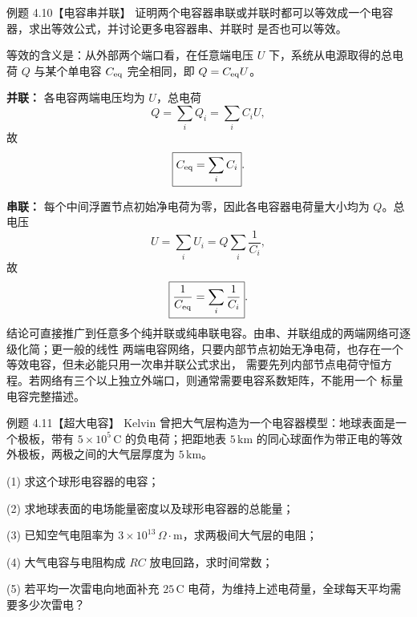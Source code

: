 \begin{origexamplebox}{例题 4.10【电容串并联】}
证明两个电容器串联或并联时都可以等效成一个电容器，求出等效公式，并讨论更多电容器串、并联时
是否也可以等效。
\end{origexamplebox}

\begin{xesolution}
等效的含义是：从外部两个端口看，在任意端电压 $U$ 下，系统从电源取得的总电荷 $Q$ 与某个单电容
$C_{\rm eq}$ 完全相同，即 $Q=C_{\rm eq}U$。

\textbf{并联：} 各电容两端电压均为 $U$，总电荷
\[
 Q=\sum_iQ_i=\sum_iC_iU,
\]
故
\[
 \boxed{C_{\rm eq}=\sum_iC_i}.
\]

\textbf{串联：} 每个中间浮置节点初始净电荷为零，因此各电容器电荷量大小均为 $Q$。总电压
\[
 U=\sum_iU_i=Q\sum_i\frac1{C_i},
\]
故
\[
 \boxed{\frac1{C_{\rm eq}}=\sum_i\frac1{C_i}}.
\]
结论可直接推广到任意多个纯并联或纯串联电容。由串、并联组成的两端网络可逐级化简；更一般的线性
两端电容网络，只要内部节点初始无净电荷，也存在一个等效电容，但未必能只用一次串并联公式求出，
需要先列内部节点电荷守恒方程。若网络有三个以上独立外端口，则通常需要电容系数矩阵，不能用一个
标量电容完整描述。
\end{xesolution}

\begin{origexamplebox}{例题 4.11【超大电容】}
Kelvin 曾把大气层构造为一个电容器模型：地球表面是一个极板，带有
$5\times10^5\,\mathrm C$ 的负电荷；把距地表 $5\,\mathrm{km}$ 的同心球面作为带正电的等效外极板，两极之间的大气层厚度为 $5\,\mathrm{km}$。

(1) 求这个球形电容器的电容；

(2) 求地球表面的电场能量密度以及球形电容器的总能量；

(3) 已知空气电阻率为 $3\times10^{13}\,\Omega\!\cdot\!\mathrm m$，求两极间大气层的电阻；

(4) 大气电容与电阻构成 $RC$ 放电回路，求时间常数；

(5) 若平均一次雷电向地面补充 $25\,\mathrm C$ 电荷，为维持上述电荷量，全球每天平均需要多少次雷电？
\end{origexamplebox}

\earthCapacitorFigure
{}

